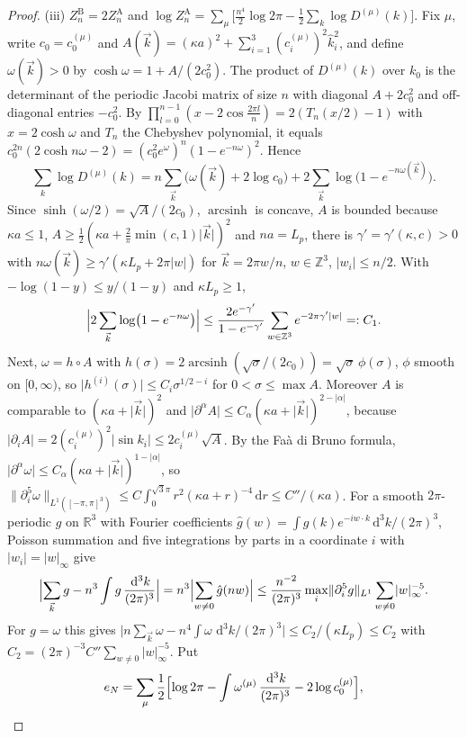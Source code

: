 \documentclass[11pt,a4paper]{amsart}
\theoremstyle{definition}
\theoremstyle{remark}
\numberwithin{equation}{section}
\newcommand{\R}{\mathbb{R}}          %
\newcommand{\Z}{\mathbb{Z}}          %
\newcommand{\norm}[1]{\lVert #1\rVert}     %
\newcommand{\abs}[1]{\lvert #1\rvert}      %
\newcommand{\dd}{\,\mathrm{d}}             %
\newcommand{\Lp}{L_p}                      %
\begin{document}
\begin{proof}
(iii) $Z^{\mathrm B}_n=2Z^{\mathrm A}_n$ and $\log Z^{\mathrm A}_n=\sum_\mu\bigl[\frac{n^4}2\log2\pi-\frac12\sum_k\log D^{(\mu)}(k)\bigr]$. Fix $\mu$, write $c_0=c^{(\mu)}_0$ and $A(\vec k)=(\kappa a)^2+\sum_{i=1}^3(c^{(\mu)}_i)^2\hat k_i^2$, and define $\omega(\vec k)>0$ by $\cosh\omega=1+A/(2c_0^2)$. The product of $D^{(\mu)}(k)$ over $k_0$ is the determinant of the periodic Jacobi matrix of size $n$ with diagonal $A+2c_0^2$ and off-diagonal entries $-c_0^2$. By $\prod_{l=0}^{n-1}(x-2\cos\frac{2\pi l}n)=2(T_n(x/2)-1)$ with $x=2\cosh\omega$ and $T_n$ the Chebyshev polynomial, it equals $c_0^{2n}(2\cosh n\omega-2)=(c_0^2e^\omega)^n(1-e^{-n\omega})^2$. Hence
\[
\sum_k\log D^{(\mu)}(k)=n\sum_{\vec k}\bigl(\omega(\vec k)+2\log c_0\bigr)+2\sum_{\vec k}\log\bigl(1-e^{-n\omega(\vec k)}\bigr).
\]
Since $\sinh(\omega/2)=\sqrt A/(2c_0)$, $\operatorname{arcsinh}$ is concave, $A$ is bounded because $\kappa a\le1$, $A\ge\frac12(\kappa a+\frac2\pi\min(c,1)\abs{\vec k})^2$ and $na=\Lp$, there is $\gamma'=\gamma'(\kappa,c)>0$ with $n\omega(\vec k)\ge\gamma'(\kappa\Lp+2\pi\abs w)$ for $\vec k=2\pi w/n$, $w\in\Z^3$, $\abs{w_i}\le n/2$. With $-\log(1-y)\le y/(1-y)$ and $\kappa\Lp\ge1$,
\[
\Bigl|2\sum_{\vec k}\log\bigl(1-e^{-n\omega}\bigr)\Bigr|\le\frac{2e^{-\gamma'}}{1-e^{-\gamma'}}\sum_{w\in\Z^3}e^{-2\pi\gamma'\abs w}=:C_1 .
\]
Next, $\omega=h\circ A$ with $h(\sigma)=2\operatorname{arcsinh}(\sqrt\sigma/(2c_0))=\sqrt\sigma\,\phi(\sigma)$, $\phi$ smooth on $[0,\infty)$, so $\abs{h^{(i)}(\sigma)}\le C_i\sigma^{1/2-i}$ for $0<\sigma\le\max A$. Moreover $A$ is comparable to $(\kappa a+\abs{\vec k})^2$ and $\abs{\partial^\alpha A}\le C_\alpha(\kappa a+\abs{\vec k})^{2-\abs\alpha}$, because $\abs{\partial_iA}=2(c^{(\mu)}_i)^2\abs{\sin k_i}\le2c^{(\mu)}_i\sqrt A$. By the Fa\`a di Bruno formula, $\abs{\partial^\alpha\omega}\le C_\alpha(\kappa a+\abs{\vec k})^{1-\abs\alpha}$, so $\norm{\partial_i^5\omega}_{L^1([-\pi,\pi]^3)}\le C\int_0^{\sqrt3\pi}r^2(\kappa a+r)^{-4}\dd r\le C''/(\kappa a)$. For a smooth $2\pi$-periodic $g$ on $\R^3$ with Fourier coefficients $\hat g(w)=\int g(k)e^{-iw\cdot k}\dd^3k/(2\pi)^3$, Poisson summation and five integrations by parts in a coordinate $i$ with $\abs{w_i}=\abs w_\infty$ give
\[
\Bigl|\sum_{\vec k}g-n^3\int g\,\frac{\dd^3k}{(2\pi)^3}\Bigr|=n^3\Bigl|\sum_{w\ne0}\hat g(nw)\Bigr|\le\frac{n^{-2}}{(2\pi)^3}\max_i\norm{\partial_i^5g}_{L^1}\sum_{w\ne0}\abs w_\infty^{-5}.
\]
For $g=\omega$ this gives $\abs{n\sum_{\vec k}\omega-n^4\int\omega\,\dd^3k/(2\pi)^3}\le C_2/(\kappa\Lp)\le C_2$ with $C_2=(2\pi)^{-3}C''\sum_{w\ne0}\abs w_\infty^{-5}$. Put
\[
e_N=\sum_\mu\frac12\Bigl[\log2\pi-\int\omega^{(\mu)}\,\frac{\dd^3k}{(2\pi)^3}-2\log c^{(\mu)}_0\Bigr],
\]
\end{proof}
\end{document}
